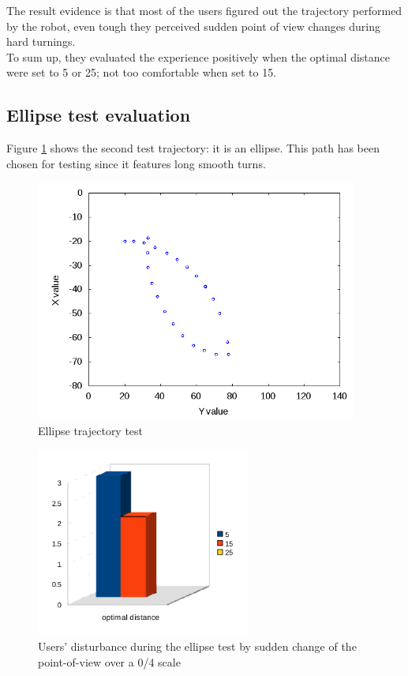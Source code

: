 The result evidence is that most of the users figured out the
trajectory performed by the robot, even tough they perceived
sudden point of view changes during hard turnings.
\\
To sum up, they evaluated the experience positively when the
optimal distance were set to 5 or 25; not too comfortable
when set to 15.


\subsection{Ellipse test evaluation}
\label{performance_evaluation:tests_result:ellipsetest}

Figure \ref{fig:ellipsetest} shows the second test trajectory:
it is an ellipse. This path has been chosen for testing since it
features long smooth turns.

\begin{figure}[!h]
  \begin{center}
    \includegraphics[width=300pt]{img/path_session_5.png}
    \caption{Ellipse trajectory test}
    \label{fig:ellipsetest}
  \end{center}
\end{figure}

\begin{figure}[!h]
  \begin{center}
    \includegraphics[width=200pt]{img/ellipse.png}
    \caption{Users' disturbance during the ellipse test 
      by sudden change of the point-of-view over a 0/4 scale}
  \end{center}
\end{figure}

